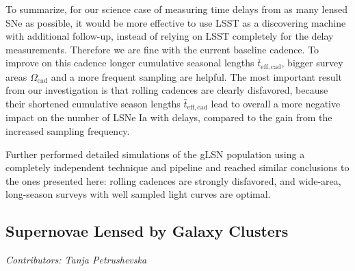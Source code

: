 To summarize, for our science case of measuring time delays from as many lensed SNe as possible, it would be more effective to use LSST as a discovering machine with additional follow-up, instead of relying on LSST completely for the delay measurements. Therefore we are fine with the current baseline cadence. To improve on this cadence longer cumulative seasonal lengths $\bar{t}_\mathrm{eff,cad}$, bigger survey areas $\Omega_\mathrm{cad}$ and a more frequent sampling are helpful. The most important result from our investigation is that rolling cadences are clearly disfavored, because their shortened cumulative season lengths $\bar{t}_\mathrm{eff,cad}$ lead to overall a more negative impact on the number of LSNe Ia with delays, compared to the gain from the increased sampling frequency.
%

Further \cite{Goldstein:2018bue} performed detailed simulations of the gLSN population using a completely independent technique and pipeline and reached similar conclusions to the ones presented here: rolling cadences are strongly disfavored, and wide-area, long-season surveys with well sampled light curves are optimal.



\FloatBarrier
\subsection{Supernovae Lensed by Galaxy Clusters}
\textit{Contributors: Tanja Petrushevska}

